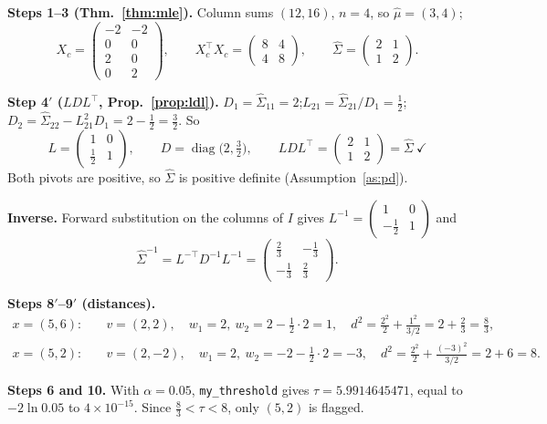 \documentclass[11pt]{article}
\theoremstyle{definition}
\newcommand{\T}{^{\top}}
\newcommand{\diag}{\operatorname{diag}}
\begin{document}
\textbf{Steps 1--3 (Thm.~\ref{thm:mle}).} Column sums $(12,16)$, $n=4$, so $\hat\mu=(3,4)$;
\[
X_c=\begin{pmatrix}-2&-2\\0&0\\2&0\\0&2\end{pmatrix},\qquad X_c\T X_c=\begin{pmatrix}8&4\\4&8\end{pmatrix},\qquad \hat\Sigma=\begin{pmatrix}2&1\\1&2\end{pmatrix}.
\]

\textbf{Step 4$'$ ($LDL\T$, Prop.~\ref{prop:ldl}).}
$D_1=\hat\Sigma_{11}=2$;\quad $L_{21}=\hat\Sigma_{21}/D_1=\tfrac12$;\quad $D_2=\hat\Sigma_{22}-L_{21}^2D_1=2-\tfrac12=\tfrac32$. So
\[
L=\begin{pmatrix}1&0\\\tfrac12&1\end{pmatrix},\qquad D=\diag\big(2,\tfrac32\big),\qquad LDL\T=\begin{pmatrix}2&1\\1&2\end{pmatrix}=\hat\Sigma\ \checkmark
\]
Both pivots are positive, so $\hat\Sigma$ is positive definite (Assumption~\ref{as:pd}).

\textbf{Inverse.} Forward substitution on the columns of $I$ gives $L^{-1}=\begin{pmatrix}1&0\\-\tfrac12&1\end{pmatrix}$ and
\[
\hat\Sigma^{-1}=L^{-\top}D^{-1}L^{-1}=\begin{pmatrix}\tfrac23&-\tfrac13\\-\tfrac13&\tfrac23\end{pmatrix}.
\]

\textbf{Steps 8$'$--9$'$ (distances).}
\begin{align*}
x=(5,6):&\quad v=(2,2),\quad w_1=2,\ w_2=2-\tfrac12\cdot2=1,\quad d^2=\tfrac{2^2}{2}+\tfrac{1^2}{3/2}=2+\tfrac23=\tfrac83,\\
x=(5,2):&\quad v=(2,-2),\quad w_1=2,\ w_2=-2-\tfrac12\cdot2=-3,\quad d^2=\tfrac{2^2}{2}+\tfrac{(-3)^2}{3/2}=2+6=8.
\end{align*}

\textbf{Steps 6 and 10.} With $\alpha=0.05$, \texttt{my\_threshold} gives $\tau=5.9914645471$, equal to $-2\ln0.05$ to $4\times10^{-15}$. Since $\tfrac83<\tau<8$, only $(5,2)$ is flagged.
\end{document}
